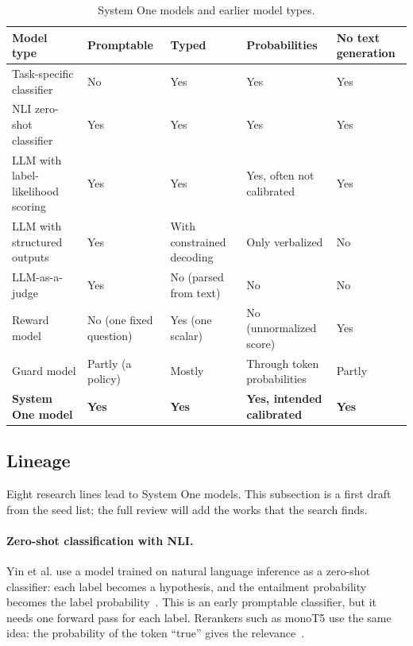 \documentclass[acmsmall,nonacm,screen]{acmart}
\newcommand{\sone}{System One model\xspace}
\newcommand{\sones}{System One models\xspace}
\begin{document}
\begin{table}[t]
  \caption{\sones and earlier model types.}
  \label{tab:neighbors}
  \footnotesize
  \begin{tabularx}{\linewidth}{@{}*{5}{>{\raggedright\arraybackslash}X}@{}}
    \toprule
    Model type & Promptable & Typed & Probabilities & No text generation \\
    \midrule
    Task-specific classifier & No & Yes & Yes & Yes \\
    NLI zero-shot classifier & Yes & Yes & Yes & Yes \\
    LLM with label-likelihood scoring & Yes & Yes & Yes, often not calibrated & Yes \\
    LLM with structured outputs & Yes & With constrained decoding & Only verbalized & No \\
    LLM-as-a-judge & Yes & No (parsed from text) & No & No \\
    Reward model & No (one fixed question) & Yes (one scalar) & No (unnormalized score) & Yes \\
    Guard model & Partly (a policy) & Mostly & Through token probabilities & Partly \\
    \textbf{\sone} & \textbf{Yes} & \textbf{Yes} & \textbf{Yes, intended calibrated} & \textbf{Yes} \\
    \bottomrule
  \end{tabularx}
\end{table}

\subsection{Lineage}
\label{sec:lineage}
Eight research lines lead to \sones. This subsection is a first draft from the seed list; the full review will add the works that the search finds.

\paragraph{Zero-shot classification with NLI.} Yin et al. use a model trained on natural language inference as a zero-shot classifier: each label becomes a hypothesis, and the entailment probability becomes the label probability~\cite{yin2019benchmarking}. This is an early promptable classifier, but it needs one forward pass for each label. Rerankers such as monoT5 use the same idea: the probability of the token ``true'' gives the relevance~\cite{nogueira2020document}.
\end{document}
